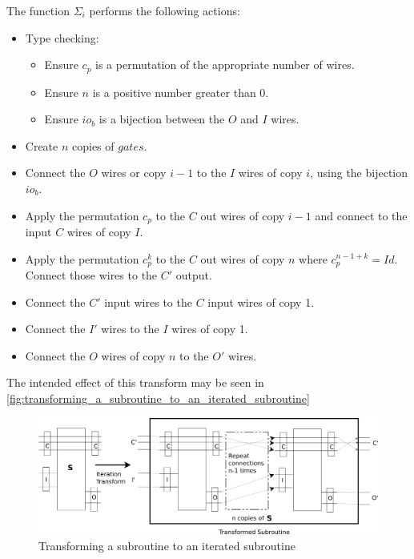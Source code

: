 The function $\Sigma_i$ performs the following actions:
\begin{itemize}
  \item Type checking:
  \begin{itemize}
    \item Ensure  $c_p$ is a permutation of the appropriate number of wires.
    \item Ensure $n$ is a positive number greater than 0.
    \item Ensure $io_b$ is a bijection between the $O$ and $I$ wires.
  \end{itemize}
  \item Create $n$ copies of $gates$.
  \item Connect the $O$ wires or copy $i-1$ to the $I$ wires of copy $i$, using the bijection
  $io_b$.
  \item Apply the permutation $c_p$ to the $C$ out wires of copy $i-1$ and connect to the input $C$
  wires of copy $I$.
  \item Apply the permutation $c_p^k$ to the $C$ out wires of copy $n$ where $c_p^{n-1+k} = Id$.
  Connect those wires to the $C'$ output.
  \item Connect the $C'$ input wires to the $C$ input wires of copy 1.
  \item Connect the $I'$ wires to the $I$ wires of copy 1.
  \item Connect the $O$ wires of copy $n$ to the $O'$ wires.
\end{itemize}

The intended effect of this transform may be seen in
\vref{fig:transforming_a_subroutine_to_an_iterated_subroutine}
\begin{figure}[htbp]
 \centering
      \includegraphics[scale=.4]{diagrams/SubroutineIterationTransform.png}
  \caption{Transforming a subroutine to an iterated subroutine}
  \label{fig:transforming_a_subroutine_to_an_iterated_subroutine}
\end{figure}

